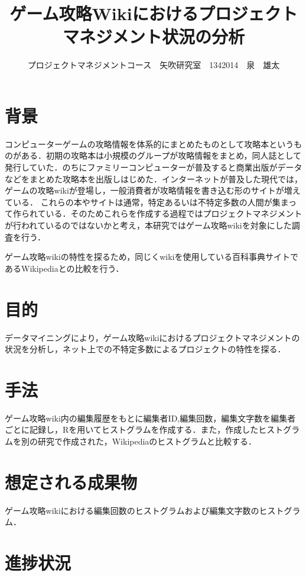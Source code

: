 \documentclass[uplatex,twocolumn,dvipdfmx]{jsarticle}
\title{\vspace{-5mm}\fontsize{14pt}{0pt}\selectfont  ゲーム攻略Wikiにおけるプロジェクトマネジメント状況の分析}
\author{\normalsize プロジェクトマネジメントコース　矢吹研究室　1342014　泉　雄太}
\date{}
\begin{document}
\fontsize{10.5pt}{\baselineskip}\selectfont
\maketitle





\section{背景}

コンピューターゲームの攻略情報を体系的にまとめたものとして攻略本というものがある．初期の攻略本は小規模のグループが攻略情報をまとめ，同人誌として発行していた．のちにファミリーコンピューターが普及すると商業出版がデータなどをまとめた攻略本を出版しはじめた．インターネットが普及した現代では，ゲームの攻略wikiが登場し，一般消費者が攻略情報を書き込む形のサイトが増えている．
これらの本やサイトは通常，特定あるいは不特定多数の人間が集まって作られている．そのためこれらを作成する過程ではプロジェクトマネジメントが行われているのではないかと考え，本研究ではゲーム攻略wikiを対象にした調査を行う．

ゲーム攻略wikiの特性を探るため，同じくwikiを使用している百科事典サイトであるWikipediaとの比較を行う．



\section{目的}

データマイニングにより，ゲーム攻略wikiにおけるプロジェクトマネジメントの状況を分析し，ネット上での不特定多数によるプロジェクトの特性を探る．

\section{手法}

ゲーム攻略wiki内の編集履歴をもとに編集者ID,編集回数，編集文字数を編集者ごとに記録し，Rを用いてヒストグラムを作成する．また，作成したヒストグラムを別の研究で作成された，Wikipediaのヒストグラムと比較する．

\section{想定される成果物}

ゲーム攻略wikiにおける編集回数のヒストグラムおよび編集文字数のヒストグラム．

\section{進捗状況}
\end{document}
